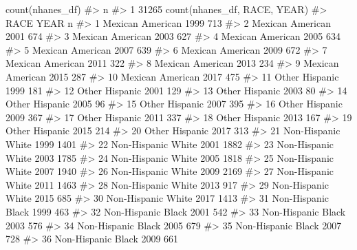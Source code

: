\documentclass[
  letterpaper,
]{latex/krantz}
\makeatletter
\newenvironment{Shaded}{\begin{snugshade}}{\end{snugshade}}
\newcommand{\CommentTok}[1]{\textcolor[rgb]{0.37,0.37,0.37}{#1}}
\newcommand{\FunctionTok}[1]{\textcolor[rgb]{0.28,0.35,0.67}{#1}}
\newcommand{\NormalTok}[1]{\textcolor[rgb]{0.00,0.23,0.31}{#1}}
\newenvironment{kframe}{%
\medskip{}
\setlength{\fboxsep}{.8em}
 \def\at@end@of@kframe{}%
 \ifinner\ifhmode%
  \def\at@end@of@kframe{\end{minipage}}%
  \begin{minipage}{\columnwidth}%
 \fi\fi%
 \def\FrameCommand##1{\hskip\@totalleftmargin \hskip-\fboxsep
 \colorbox{shadecolor}{##1}\hskip-\fboxsep
     \hskip-\linewidth \hskip-\@totalleftmargin \hskip\columnwidth}%
 \MakeFramed {\advance\hsize-\width
   \@totalleftmargin\z@ \linewidth\hsize
   \@setminipage}}%
 {\par\unskip\endMakeFramed%
 \at@end@of@kframe}
\renewenvironment{Shaded}{\begin{kframe}}{\end{kframe}}
\makeatother
\begin{document}
\begin{Shaded}
\begin{Highlighting}[]
\FunctionTok{count}\NormalTok{(nhanes\_df)}
\CommentTok{\#\textgreater{}       n}
\CommentTok{\#\textgreater{} 1 31265}
\FunctionTok{count}\NormalTok{(nhanes\_df, RACE, YEAR)}
\CommentTok{\#\textgreater{}                  RACE YEAR    n}
\CommentTok{\#\textgreater{} 1    Mexican American 1999  713}
\CommentTok{\#\textgreater{} 2    Mexican American 2001  674}
\CommentTok{\#\textgreater{} 3    Mexican American 2003  627}
\CommentTok{\#\textgreater{} 4    Mexican American 2005  634}
\CommentTok{\#\textgreater{} 5    Mexican American 2007  639}
\CommentTok{\#\textgreater{} 6    Mexican American 2009  672}
\CommentTok{\#\textgreater{} 7    Mexican American 2011  322}
\CommentTok{\#\textgreater{} 8    Mexican American 2013  234}
\CommentTok{\#\textgreater{} 9    Mexican American 2015  287}
\CommentTok{\#\textgreater{} 10   Mexican American 2017  475}
\CommentTok{\#\textgreater{} 11     Other Hispanic 1999  181}
\CommentTok{\#\textgreater{} 12     Other Hispanic 2001  129}
\CommentTok{\#\textgreater{} 13     Other Hispanic 2003   80}
\CommentTok{\#\textgreater{} 14     Other Hispanic 2005   96}
\CommentTok{\#\textgreater{} 15     Other Hispanic 2007  395}
\CommentTok{\#\textgreater{} 16     Other Hispanic 2009  367}
\CommentTok{\#\textgreater{} 17     Other Hispanic 2011  337}
\CommentTok{\#\textgreater{} 18     Other Hispanic 2013  167}
\CommentTok{\#\textgreater{} 19     Other Hispanic 2015  214}
\CommentTok{\#\textgreater{} 20     Other Hispanic 2017  313}
\CommentTok{\#\textgreater{} 21 Non{-}Hispanic White 1999 1401}
\CommentTok{\#\textgreater{} 22 Non{-}Hispanic White 2001 1882}
\CommentTok{\#\textgreater{} 23 Non{-}Hispanic White 2003 1785}
\CommentTok{\#\textgreater{} 24 Non{-}Hispanic White 2005 1818}
\CommentTok{\#\textgreater{} 25 Non{-}Hispanic White 2007 1940}
\CommentTok{\#\textgreater{} 26 Non{-}Hispanic White 2009 2169}
\CommentTok{\#\textgreater{} 27 Non{-}Hispanic White 2011 1463}
\CommentTok{\#\textgreater{} 28 Non{-}Hispanic White 2013  917}
\CommentTok{\#\textgreater{} 29 Non{-}Hispanic White 2015  685}
\CommentTok{\#\textgreater{} 30 Non{-}Hispanic White 2017 1413}
\CommentTok{\#\textgreater{} 31 Non{-}Hispanic Black 1999  463}
\CommentTok{\#\textgreater{} 32 Non{-}Hispanic Black 2001  542}
\CommentTok{\#\textgreater{} 33 Non{-}Hispanic Black 2003  576}
\CommentTok{\#\textgreater{} 34 Non{-}Hispanic Black 2005  679}
\CommentTok{\#\textgreater{} 35 Non{-}Hispanic Black 2007  728}
\CommentTok{\#\textgreater{} 36 Non{-}Hispanic Black 2009  661}

\end{Highlighting}
\end{Shaded}
\end{document}
